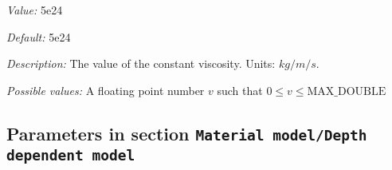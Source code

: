 \begin{itemize}
{\it Value:} 5e24


{\it Default:} 5e24


{\it Description:} The value of the constant viscosity. Units: $kg/m/s$.


{\it Possible values:} A floating point number $v$ such that $0 \leq v \leq \text{MAX\_DOUBLE}$
\end{itemize}

\subsection{Parameters in section \tt Material model/Depth dependent model}
\label{parameters:Material_20model/Depth_20dependent_20model}

